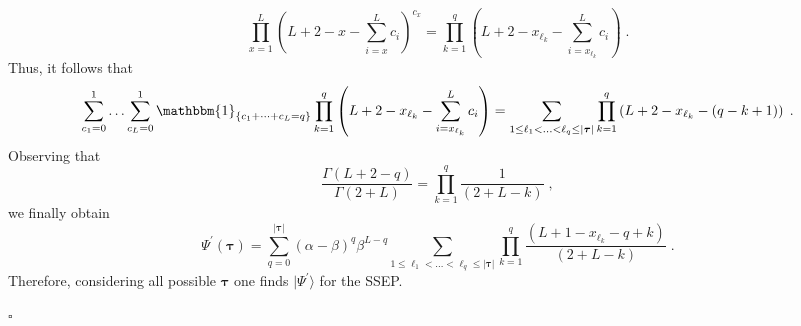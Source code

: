 \documentclass[10pt]{article}
\numberwithin{equation}{section}
\numberwithin{equation}{subsection}
\newcommand{\co}{\;,}
\newcommand{\dt}{\;.}
\begin{document}
\begin{equation}
	\prod_{x=1}^{L}\left(L+2-x-\sum_{i=x}^{L}c_{i}\right)^{c_{x}}=\prod_{k=1}^{q}\left(L+2-x_{\ell_{k}}-\sum_{i=x_{\ell_{k}}}^{L}c_{i}\right)\dt
\end{equation}
Thus, it follows that
\begin{equation}
	\sum_{c_{1}=0}^{1}\ldots\sum_{c_{L}=0}^{1}\mathbbm{1}_{\{c_{1}+\cdots+c_{L}=q\}}\prod_{k=1}^{q}\left(L+2-x_{\ell_{k}}-\sum_{i=x_{\ell_{k}}}^{L}c_{i}\right)=\sum_{1\leq \ell_{1}<\ldots<\ell_{q}\leq |\bm{\tau}|}\prod_{k=1}^{q}\left(L+2-x_{\ell_{k}}-(q-k+1)\right)\dt
\end{equation} 
Observing that
\begin{equation}
	\frac{\Gamma(L+2-q)}{\Gamma(2+L)}=\prod_{k=1}^{q}\frac{1}{(2+L-k)}\co
\end{equation}
we finally obtain 
\begin{equation}\label{PsiI-N2}
	\Psi^{'}(\bm{\tau})=\sum_{q=0}^{|\bm{\tau}|}(\alpha-\beta)^{q}\beta^{L-q}\sum_{1\leq \ell_{1}<\ldots<\ell_{q}\leq |\bm{\tau}|}\prod_{k=1}^{q}\frac{\left(L+1-x_{\ell_{k}}-q+k\right)}{(2+L-k)}\dt
\end{equation}
Therefore, considering all possible $\bm{\tau}$ one finds $|\Psi^{'}\rangle$ for the SSEP. 
\begin{flushright}
	$\square$
\end{flushright}
\end{document}

